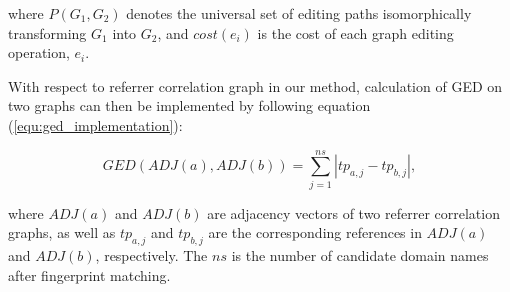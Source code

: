 where $P(G_{1}, G_{2})$ denotes the universal set of editing paths isomorphically transforming $G_{1}$ into $G_{2}$, and $cost(e_{i})$ is the cost of each graph editing operation, $e_{i}$.

With respect to referrer correlation graph in our method, calculation of GED on two graphs can then be implemented by following equation (\ref{equ:ged_implementation}): 

\begin{equation}
GED(ADJ(a), ADJ(b)) = \sum\limits_{j=1}^{ns}\left|tp_{a,j} - tp_{b,j}\right|,
\label{equ:ged_implementation}
\end{equation}

where $ADJ(a)$ and $ADJ(b)$ are adjacency vectors of two referrer correlation graphs, as well as $tp_{a,j}$ and $tp_{b,j}$ are the corresponding references in $ADJ(a)$ and $ADJ(b)$, respectively. The $ns$ is the number of candidate domain names after fingerprint matching.